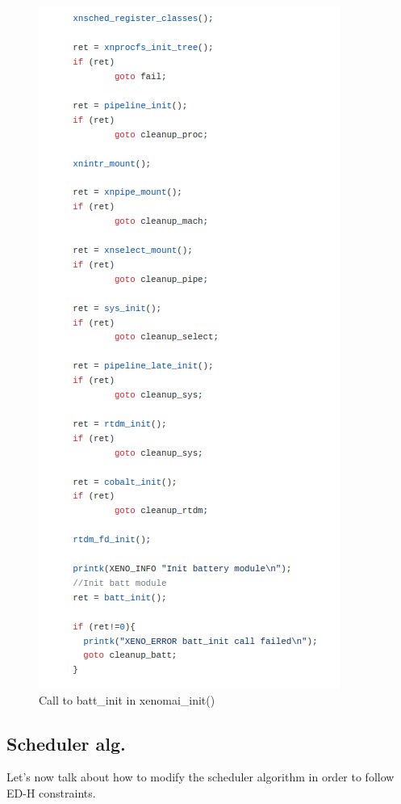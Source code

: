 \documentclass[12pt,hidelinks]{article}
\begin{document}
{	    \begin{figure}[!h]
        \centering
    	\includegraphics[scale=1]{initCall.png}
    	\caption{Call to batt\_init in xenomai\_init()}
    	\end{figure} \newline
    	 
	\newpage \subsection{Scheduler alg.} \label{slack_param}
	Let's now talk about how to modify the scheduler algorithm in order to follow ED-H constraints.
	
}
\end{document}
